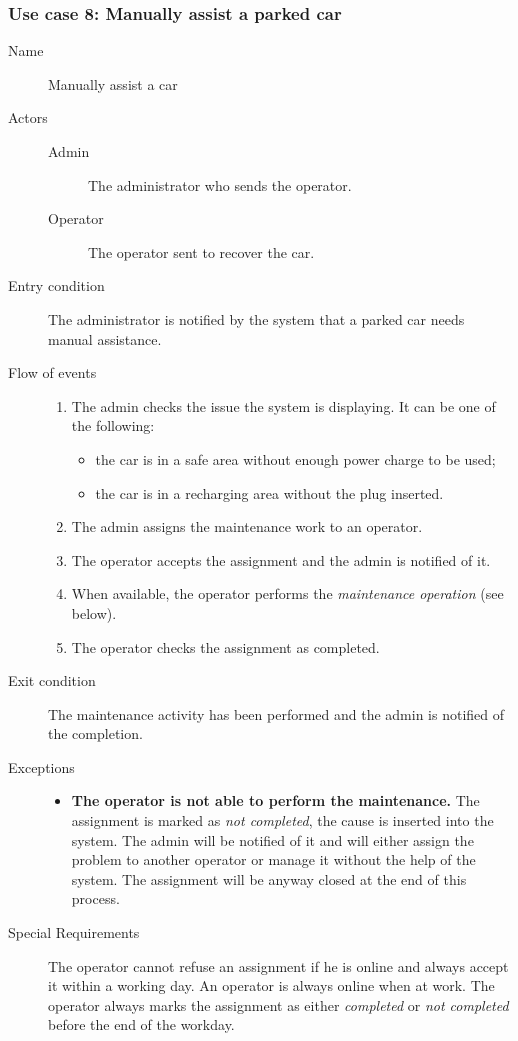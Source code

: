 	\subsubsection{Use case 8: Manually assist a parked car}
		\begin{description}
			\item[Name] Manually assist a car
			\item[Actors] \hfill
				\begin{description}
					\item[Admin] The administrator who sends the operator.
					\item[Operator] The operator sent to recover the car.
				\end{description}
			\item[Entry condition] The administrator is notified by the system that a parked car needs manual assistance.
			\item[Flow of events] \hfill
				\begin{enumerate}
					\item The admin checks the issue the system is displaying. It can be one of the following:
						\begin{itemize}
							\item the car is in a safe area without enough power charge to be used;
							\item the car is in a recharging area without the plug inserted.
						\end{itemize}
					\item The admin assigns the maintenance work to an operator.
					\item The operator accepts the assignment and the admin is notified of it.
					\item When available, the operator performs the \textit{maintenance operation} (see below).
					\item The operator checks the assignment as completed.
				\end{enumerate}
			\item[Exit condition] The maintenance activity has been performed and the admin is notified of the completion.
			\item[Exceptions] \hfill
				\begin{itemize}
					\item \textbf{The operator is not able to perform the maintenance.} The assignment is marked as \textit{not completed}, the cause is inserted into the system. The admin will be notified of it and will either assign the problem to another operator or manage it without the help of the system. The assignment will be anyway closed at the end of this process.
				\end{itemize}
			\item[Special Requirements] The operator cannot refuse an assignment if he is online and always accept it within a working day. An operator is always online when at work.
			The operator always marks the assignment as either \textit{completed} or \textit{not completed} before the end of the workday.
		\end{description}
